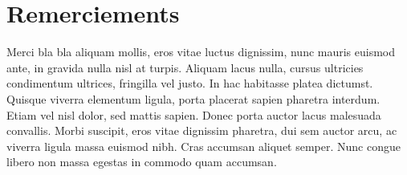 \chapter*{Remerciements}
Merci bla bla aliquam mollis, eros vitae luctus dignissim, nunc mauris euismod ante, in gravida nulla nisl at turpis. Aliquam lacus nulla, cursus ultricies condimentum ultrices, fringilla vel justo. In hac habitasse platea dictumst. Quisque viverra elementum ligula, porta placerat sapien pharetra interdum. Etiam vel nisl dolor, sed mattis sapien. Donec porta auctor lacus malesuada convallis. Morbi suscipit, eros vitae dignissim pharetra, dui sem auctor arcu, ac viverra ligula massa euismod nibh. Cras accumsan aliquet semper. Nunc congue libero non massa egestas in commodo quam accumsan. 
